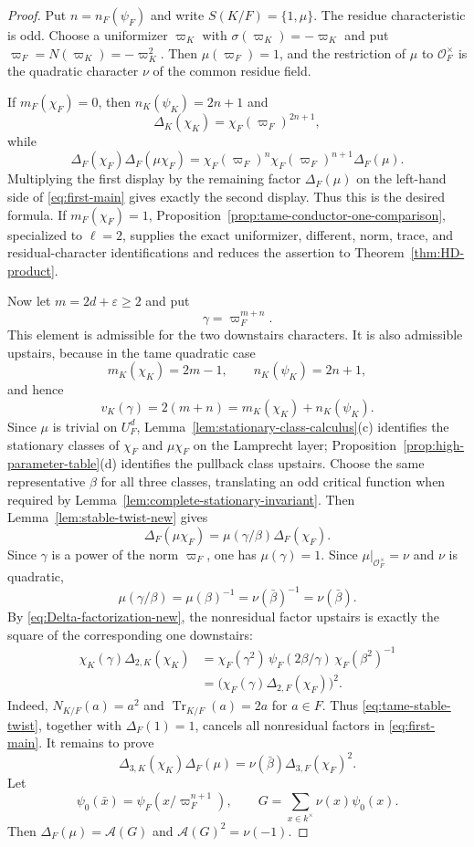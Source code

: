 \documentclass[11pt]{amsart}
\theoremstyle{definition}
\theoremstyle{remark}
\newcommand{\cO}{\mathcal O}
\newcommand{\Tr}{\operatorname{Tr}}
\newcommand{\Aphase}{\mathcal A}
\begin{document}
\begin{proof}
Put $n=n_F(\psi_F)$ and write $S(K/F)=\{1,\mu\}$.  The residue
characteristic is odd.  Choose a uniformizer $\varpi_K$ with
$\sigma(\varpi_K)=-\varpi_K$ and put
$\varpi_F=N(\varpi_K)=-\varpi_K^2$.  Then $\mu(\varpi_F)=1$, and the
restriction of $\mu$ to $\cO_F^\times$ is the quadratic character
$\nu$ of the common residue field.

If $m_F(\chi_F)=0$, then $n_K(\psi_K)=2n+1$ and
\[
 \Delta_K(\chi_K)=\chi_F(\varpi_F)^{2n+1},
\]
while
\[
 \Delta_F(\chi_F)\Delta_F(\mu\chi_F)
 =\chi_F(\varpi_F)^n
  \chi_F(\varpi_F)^{n+1}\Delta_F(\mu).
\]
Multiplying the first display by the remaining factor $\Delta_F(\mu)$
on the left-hand side of \eqref{eq:first-main} gives exactly the second
display.  Thus this is the desired formula.  If $m_F(\chi_F)=1$,
Proposition~\ref{prop:tame-conductor-one-comparison}, specialized to
$\ell=2$, supplies the exact uniformizer, different, norm, trace, and
residual-character identifications and reduces the assertion to
Theorem~\ref{thm:HD-product}.

Now let $m=2d+\varepsilon\ge2$ and put
\[
 \gamma=\varpi_F^{m+n}.
\]
This element is admissible for the two downstairs characters.  It is
also admissible upstairs, because in the tame quadratic case
\[
 m_K(\chi_K)=2m-1,\qquad n_K(\psi_K)=2n+1,
\]
and hence
\[
 v_K(\gamma)=2(m+n)=m_K(\chi_K)+n_K(\psi_K).
\]
Since $\mu$ is trivial on $U_F^d$,
Lemma~\ref{lem:stationary-class-calculus}(c) identifies the stationary
classes of $\chi_F$ and $\mu\chi_F$ on the Lamprecht layer;
Proposition~\ref{prop:high-parameter-table}(d) identifies the pullback
class upstairs.  Choose the same representative $\beta$ for all three
classes, translating an odd critical function when required by
Lemma~\ref{lem:complete-stationary-invariant}.  Then
Lemma~\ref{lem:stable-twist-new} gives
\begin{equation}\label{eq:tame-stable-twist}
 \Delta_F(\mu\chi_F)=\mu(\gamma/\beta)\Delta_F(\chi_F).
\end{equation}
Since $\gamma$ is a power of the norm $\varpi_F$, one has
$\mu(\gamma)=1$.  Since $\mu|_{\cO_F^\times}=\nu$ and $\nu$ is
quadratic,
\[
 \mu(\gamma/\beta)=\mu(\beta)^{-1}
 =\nu(\bar\beta)^{-1}=\nu(\bar\beta).
\]
By \eqref{eq:Delta-factorization-new}, the nonresidual factor upstairs
is exactly the square of the corresponding one downstairs:
\begin{align*}
 \chi_K(\gamma)\Delta_{2,K}(\chi_K)
 &=\chi_F(\gamma^2)\,
   \psi_F(2\beta/\gamma)\,\chi_F(\beta^2)^{-1}\\
 &=\bigl(\chi_F(\gamma)\Delta_{2,F}(\chi_F)\bigr)^2.
\end{align*}
Indeed, $N_{K/F}(a)=a^2$ and $\Tr_{K/F}(a)=2a$ for $a\in F$.
Thus \eqref{eq:tame-stable-twist}, together with $\Delta_F(1)=1$,
cancels all nonresidual factors in \eqref{eq:first-main}.  It remains
to prove
\begin{equation}\label{eq:tame-quadratic-residual}
 \Delta_{3,K}(\chi_K)\Delta_F(\mu)
 =\nu(\bar\beta)\Delta_{3,F}(\chi_F)^2.
\end{equation}
Let
\[
 \psi_0(\bar x)=\psi_F(x/\varpi_F^{n+1}),
 \qquad G=\sum_{x\in k^\times}\nu(x)\psi_0(x).
\]
Then $\Delta_F(\mu)=\Aphase(G)$ and
$\Aphase(G)^2=\nu(-1)$.


\end{proof}
\end{document}
